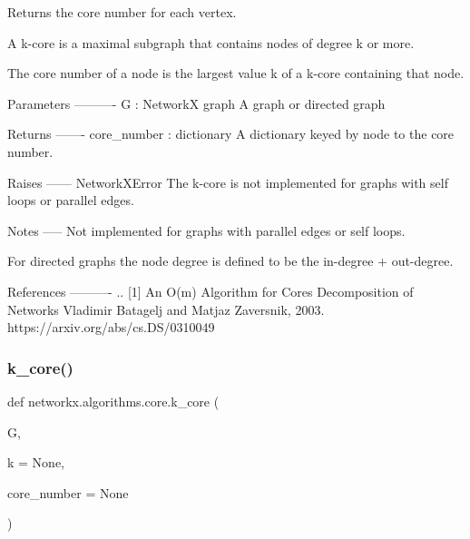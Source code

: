 \begin{DoxyVerb}Returns the core number for each vertex.

A k-core is a maximal subgraph that contains nodes of degree k or more.

The core number of a node is the largest value k of a k-core containing
that node.

Parameters
----------
G : NetworkX graph
   A graph or directed graph

Returns
-------
core_number : dictionary
   A dictionary keyed by node to the core number.

Raises
------
NetworkXError
    The k-core is not implemented for graphs with self loops
    or parallel edges.

Notes
-----
Not implemented for graphs with parallel edges or self loops.

For directed graphs the node degree is defined to be the
in-degree + out-degree.

References
----------
.. [1] An O(m) Algorithm for Cores Decomposition of Networks
   Vladimir Batagelj and Matjaz Zaversnik, 2003.
   https://arxiv.org/abs/cs.DS/0310049
\end{DoxyVerb}
 \mbox{\label{namespacenetworkx_1_1algorithms_1_1core_ab5db12dc45461ec3c6f9565cf96833b8}} 
\subsubsection{\texorpdfstring{k\+\_\+core()}{k\_core()}}
{\footnotesize\ttfamily def networkx.\+algorithms.\+core.\+k\+\_\+core (\begin{DoxyParamCaption}\item[{}]{G,  }\item[{}]{k = {\ttfamily None},  }\item[{}]{core\+\_\+number = {\ttfamily None} }\end{DoxyParamCaption})}

